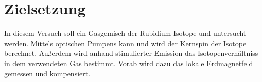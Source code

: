 \chapter{Zielsetzung}
\label{cha:zielsetzung}
In diesem Versuch soll ein Gasgemisch der Rubidium-Isotope  und  untersucht werden. Mittels optischen Pumpens kann und wird der Kernspin der Isotope 
berechnet. Außerdem wird anhand stimulierter Emission das Isotopenverhältniss in dem verwendeten Gas bestimmt. Vorab wird dazu das lokale Erdmagnetfeld gemessen und kompensiert.  